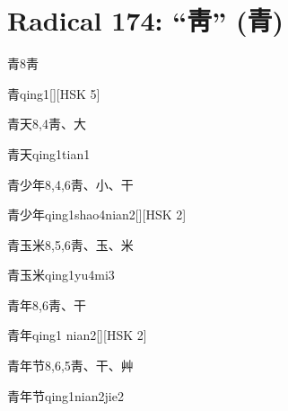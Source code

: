 
\section*{Radical 174: ``⾭'' (青)}

\begin{entry}{青}{8}{⾭}
  \begin{phonetics}{青}{qing1}[][HSK 5]
  \end{phonetics}
\end{entry}

\begin{entry}{青天}{8,4}{⾭、⼤}
  \begin{phonetics}{青天}{qing1tian1}
  \end{phonetics}
\end{entry}

\begin{entry}{青少年}{8,4,6}{⾭、⼩、⼲}
  \begin{phonetics}{青少年}{qing1shao4nian2}[][HSK 2]
  \end{phonetics}
\end{entry}

\begin{entry}{青玉米}{8,5,6}{⾭、⽟、⽶}
  \begin{phonetics}{青玉米}{qing1yu4mi3}
  \end{phonetics}
\end{entry}

\begin{entry}{青年}{8,6}{⾭、⼲}
  \begin{phonetics}{青年}{qing1 nian2}[][HSK 2]
  \end{phonetics}
\end{entry}

\begin{entry}{青年节}{8,6,5}{⾭、⼲、⾋}
  \begin{phonetics}{青年节}{qing1nian2jie2}
  \end{phonetics}
\end{entry}

